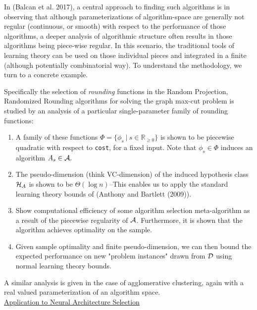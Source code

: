 \documentclass[11pt]{article}
\begin{document}
 In (Balcan et al. 2017), a central approach to finding such algorithms is in observing that although parameterizations of algorithm-space are generally not regular (continuous, or smooth) with respect to the performance of those algorithms, a deeper analysis of algorithmic structure often results in those algorithms being piece-wise regular. In this scenario, the traditional tools of learning theory can be used on those individual pieces and integrated in a finite (although potentially combinatorial way). To understand the methodology, we turn to a concrete example.

Specifically the selection of \emph{rounding} functions in the Random Projection, Randomized Rounding algorithms for solving the graph max-cut problem is studied by an analysis of a particular single-parameter family of rounding functions:

\begin{enumerate}
	\item A family of these functions $\Phi = \{ \phi_s\ |\ s \in \mathbb{R}_{\geq 0}\}$  is shown to be piecewise quadratic with respect to \verb|cost|, for a fixed input. Note that $\phi_s \in \Phi$ induces an algorithm $A_s \in {\mathcal A}.$
	\item The pseudo-dimension (think VC-dimension) of the induced hypothesis class ${\mathcal H}_A$ is shown to be $\Theta(\log n)$--This enables us to apply the standard learning theory bounds of (Anthony and Bartlett (2009)).

	\item Show computational efficiency of some algorithm selection meta-algorithm as a result of the piecewise regularity of ${\mathcal A}$. Furthermore, it is shown that the algorithm achieves optimality on the sample.

	\item Given sample optimality and finite pseudo-dimension, we can then bound the expected performance on new "problem instances" drawn from ${\mathcal D}$ using normal learning theory bounds.
\end{enumerate}

A similar analysis is given in the case of agglomerative clustering, again with a real valued parameterization of an algorithm space. \\

\medskip \noindent  \underline{Application to Neural Architecture Selection}
\end{document}
